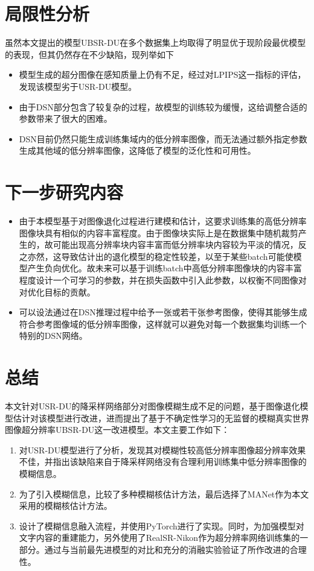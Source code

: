 \section{局限性分析}
虽然本文提出的模型UBSR-DU在多个数据集上均取得了明显优于现阶段最优模型的表现，但其仍然存在不少缺陷，现列举如下
\begin{itemize}
    \item 模型生成的超分图像在感知质量上仍有不足，经过对LPIPS这一指标的评估，发现该模型劣于USR-DU模型。
    \item 由于DSN部分包含了较复杂的过程，故模型的训练较为缓慢，这给调整合适的参数带来了很大的困难。
    \item DSN目前仍然只能生成训练集域内的低分辨率图像，而无法通过额外指定参数生成其他域的低分辨率图像，这降低了模型的泛化性和可用性。
\end{itemize}
\section{下一步研究内容}
\begin{itemize}
    \item 由于本模型基于对图像退化过程进行建模和估计，这要求训练集的高低分辨率图像块具有相似的内容丰富程度。由于图像块实际上是在数据集中随机裁剪产生的，故可能出现高分辨率块内容丰富而低分辨率块内容较为平淡的情况，反之亦然，这导致估计出的退化模型的稳定性较差，以至于某些batch可能使模型产生负向优化。故未来可以基于训练batch中高低分辨率图像块的内容丰富程度设计一个可学习的参数，并在损失函数中引入此参数，以权衡不同图像对对优化目标的贡献。
    \item 可以设法通过在DSN推理过程中给予一张或若干张参考图像，使得其能够生成符合参考图像域的低分辨率图像，这样就可以避免对每一个数据集均训练一个特别的DSN网络。
\end{itemize}
\section{总结}
本文针对USR-DU的降采样网络部分对图像模糊生成不足的问题，基于图像退化模型估计对该模型进行改进，进而提出了基于不确定性学习的无监督的模糊真实世界图像超分辨率UBSR-DU这一改进模型。本文主要工作如下：
\begin{enumerate}
    \item 对USR-DU模型进行了分析，发现其对模糊性较高低分辨率图像超分辨率效果不佳，并指出该缺陷来自于降采样网络没有合理利用训练集中低分辨率图像的模糊信息。
    \item 为了引入模糊信息，比较了多种模糊核估计方法，最后选择了MANet作为本文采用的模糊核估计方法。
    \item 设计了模糊信息融入流程，并使用PyTorch进行了实现。同时，为加强模型对文字内容的重建能力，另外使用了RealSR-Nikon作为超分辨率网络训练集的一部分。通过与当前最先进模型的对比和充分的消融实验验证了所作改进的合理性。
\end{enumerate}